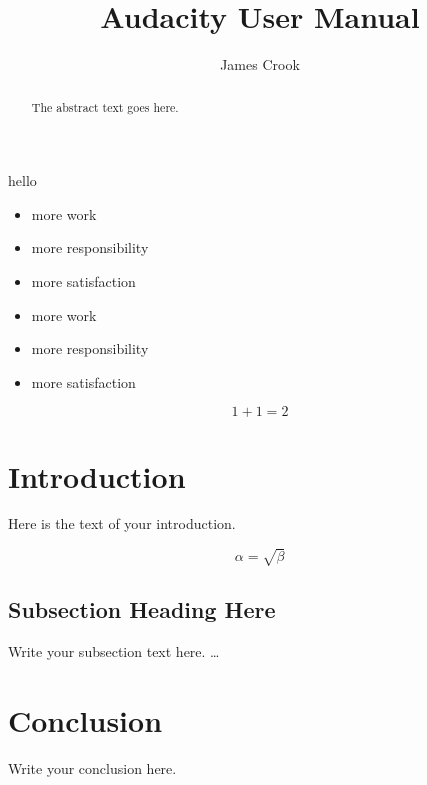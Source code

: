 \documentclass[twocolumn]{article}
\begin{document}
\title{Audacity User Manual}
\author{James Crook}

\maketitle

\begin{abstract}
The abstract text goes here.
\end{abstract}

\label{topleft}
\blindtext
\newpage
hello
\newpage
\blindtext
\begin{itemize}
\item more work
\item more responsibility
\item more satisfaction
\end{itemize}
\blindtext
\newpage
\blindtext
\begin{itemize}[noitemsep]
\item more work
\item more responsibility
\item more satisfaction
\end{itemize}

\begin{equation}\label{eq:1}
1+1=2
\end{equation}
    
\blindtext


\section{Introduction}
Here is the text of your introduction.

\begin{equation}
    \label{simple_equation}
    \alpha = \sqrt{ \beta }
\end{equation}

\subsection{Subsection Heading Here}
Write your subsection text here.
\ldots





\section{Conclusion}
Write your conclusion here.
\label{toplef}
\end{document}
